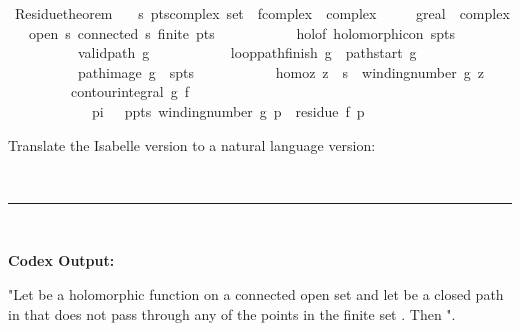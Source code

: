 \documentclass{article}
\begin{document}
\begin{boxB}
\begin{isabelle}
\isamarkupfalse \ Residue{\isacharunderscore}{\kern0pt}theorem{\isacharcolon}{\kern0pt}\isanewline
\ \ \ s\ pts{\isacharcolon}{\kern0pt}{\isacharcolon}{\kern0pt}{\isachardoublequoteopen}complex\ set{\isachardoublequoteclose}\ \ f{\isacharcolon}{\kern0pt}{\isacharcolon}{\kern0pt}{\isachardoublequoteopen}complex\ {\isasymRightarrow}\ complex{\isachardoublequoteclose}\isanewline
\ \ \ \ \ g{\isacharcolon}{\kern0pt}{\isacharcolon}{\kern0pt}{\isachardoublequoteopen}real\ {\isasymRightarrow}\ complex{\isachardoublequoteclose}\isanewline
\ \ \ {\isachardoublequoteopen}open\ s{\isachardoublequoteclose}\ {\isachardoublequoteopen}connected\ s{\isachardoublequoteclose}\ {\isachardoublequoteopen}finite\ pts{\isachardoublequoteclose}\ \isanewline
\ \ \ \ \ \ \ \ \ \ holo{\isacharcolon}{\kern0pt}{\isachardoublequoteopen}f\ holomorphic{\isacharunderscore}{\kern0pt}on\ s{\isacharminus}{\kern0pt}pts{\isachardoublequoteclose}\ \isanewline
\ \ \ \ \ \ \ \ \ \ {\isachardoublequoteopen}valid{\isacharunderscore}{\kern0pt}path\ g{\isachardoublequoteclose}\ \isanewline
\ \ \ \ \ \ \ \ \ \ loop{\isacharcolon}{\kern0pt}{\isachardoublequoteopen}pathfinish\ g\ {\isacharequal}{\kern0pt}\ pathstart\ g{\isachardoublequoteclose}\ \isanewline
\ \ \ \ \ \ \ \ \ \ {\isachardoublequoteopen}path{\isacharunderscore}{\kern0pt}image\ g\ {\isasymsubseteq}\ s{\isacharminus}{\kern0pt}pts{\isachardoublequoteclose}\ \isanewline
\ \ \ \ \ \ \ \ \ \ homo{\isacharcolon}{\kern0pt}{\isachardoublequoteopen}{\isasymforall}z{\isachardot}{\kern0pt}\ {\isacharparenleft}{\kern0pt}z\ {\isasymnotin}\ s{\isacharparenright}{\kern0pt}\ {\isasymlongrightarrow}\ winding{\isacharunderscore}{\kern0pt}number\ g\ z\ \ {\isacharequal}{\kern0pt}\ {}{\isachardoublequoteclose}\isanewline
\ \ \ \ \ \ \ \ \ {\isachardoublequoteopen}contour{\isacharunderscore}{\kern0pt}integral\ g\ f\ {\isacharequal}{\kern0pt}\ \isanewline
\ \ \ \ \ \ \ \ \ \ {}\ {\isacharasterisk}{\kern0pt}\ pi\ {\isacharasterisk}{\kern0pt}\ {\isasymi}\ {\isacharasterisk}{\kern0pt}{\isacharparenleft}{\kern0pt}{\isasymSum}p{\isasymin}pts{\isachardot}{\kern0pt}\ winding{\isacharunderscore}{\kern0pt}number\ g\ p\ {\isacharasterisk}{\kern0pt}\ residue\ f\ p{\isacharparenright}{\kern0pt}{\isachardoublequoteclose}
\end{isabelle}
Translate the Isabelle version to a natural language version:

\
\hrule
\

\textbf{Codex Output:}

"Let  be a holomorphic function on a connected open set  and let  be a closed path in  that does not pass through any of the points in the finite set . Then ".
\end{boxB}
\end{document}
